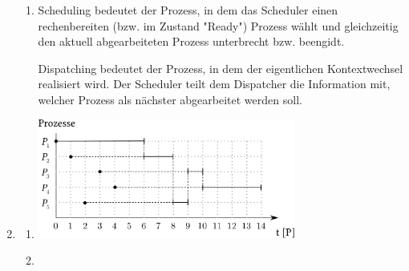\begin{enumerate}[label={Aufgabe H\arabic*},start=15]
\begin{enumerate}
			\item Scheduling bedeutet der Prozess, in dem das Scheduler einen rechenbereiten (bzw. im Zustand "Ready") Prozess wählt und gleichzeitig den aktuell abgearbeiteten Prozess unterbrecht bzw. beengidt.

			Dispatching bedeutet der Prozess, in dem der eigentlichen Kontextwechsel realisiert wird. Der Scheduler teilt dem Dispatcher die Information mit, welcher Prozess als nächster abgearbeitet werden soll. 

		\end{enumerate}
		\pagebreak
	\item 
		\begin{enumerate}
			\item \blanko

				\begin{center}
					\includegraphics[width=0.7\textwidth]{16a.eps}
				\end{center}
			\item \blanko


\end{enumerate}
\end{enumerate}
